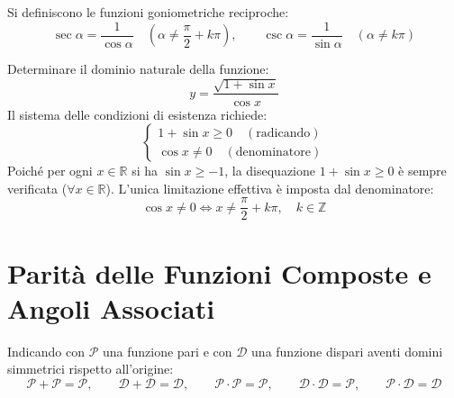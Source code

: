 \documentclass[11pt,a4paper,oneside]{report}
\begin{document}
\begin{definizione}
Si definiscono le funzioni goniometriche reciproche:
\begin{equation}
\sec\alpha = \frac{1}{\cos\alpha} \quad \left(\alpha \neq \frac{\pi}{2} + k\pi\right), \qquad \csc\alpha = \frac{1}{\sin\alpha} \quad (\alpha \neq k\pi)
\end{equation}
\end{definizione}

\begin{esempio}
Determinare il dominio naturale della funzione:
\begin{equation}
y = \frac{\sqrt{1 + \sin x}}{\cos x}
\end{equation}
Il sistema delle condizioni di esistenza richiede:
\begin{equation}
\begin{cases}
1 + \sin x \ge 0 \quad (\text{radicando})\\
\cos x \neq 0 \quad (\text{denominatore})
\end{cases}
\end{equation}
Poich\'e per ogni $x \in \mathbb{R}$ si ha $\sin x \ge -1$, la disequazione $1 + \sin x \ge 0$ \`e sempre verificata ($\forall x \in \mathbb{R}$). L'unica limitazione effettiva \`e imposta dal denominatore:
\begin{equation}
\cos x \neq 0 \iff x \neq \frac{\pi}{2} + k\pi, \quad k \in \mathbb{Z}
\end{equation}
\end{esempio}

\section{Parit\`a delle Funzioni Composte e Angoli Associati}

\begin{metodo}
Indicando con $\mathcal{P}$ una funzione pari e con $\mathcal{D}$ una funzione dispari aventi domini simmetrici rispetto all'origine:
\begin{equation}
\mathcal{P} + \mathcal{P} = \mathcal{P}, \qquad \mathcal{D} + \mathcal{D} = \mathcal{D}, \qquad \mathcal{P} \cdot \mathcal{P} = \mathcal{P}, \qquad \mathcal{D} \cdot \mathcal{D} = \mathcal{P}, \qquad \mathcal{P} \cdot \mathcal{D} = \mathcal{D}
\end{equation}
\end{metodo}
\end{document}
